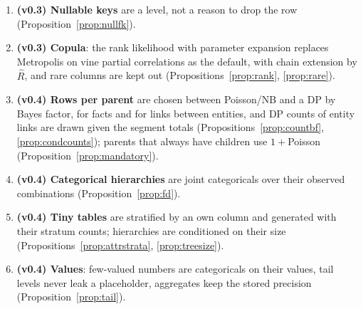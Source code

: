\documentclass[11pt,a4paper]{article}
\theoremstyle{definition}
\theoremstyle{remark}
\begin{document}
\begin{enumerate}
\item \textbf{(v0.3) Nullable keys} are a level, not a reason to drop the row (Proposition~\ref{prop:nullfk}).
\item \textbf{(v0.3) Copula}: the rank likelihood with parameter expansion replaces Metropolis on vine partial correlations as the default, with chain extension by $\hat R$, and rare columns are kept out (Propositions~\ref{prop:rank}, \ref{prop:rare}).
\item \textbf{(v0.4) Rows per parent} are chosen between Poisson/NB and a DP by Bayes factor, for facts and for links between entities, and DP counts of entity links are drawn given the segment totals (Propositions~\ref{prop:countbf}, \ref{prop:condcounts}); parents that always have children use $1+$Poisson (Proposition~\ref{prop:mandatory}).
\item \textbf{(v0.4) Categorical hierarchies} are joint categoricals over their observed combinations (Proposition~\ref{prop:fd}).
\item \textbf{(v0.4) Tiny tables} are stratified by an own column and generated with their stratum counts; hierarchies are conditioned on their size (Propositions~\ref{prop:attrstrata}, \ref{prop:treesize}).
\item \textbf{(v0.4) Values}: few-valued numbers are categoricals on their values, tail levels never leak a placeholder, aggregates keep the stored precision (Proposition~\ref{prop:tail}).
\end{enumerate}

\end{document}

